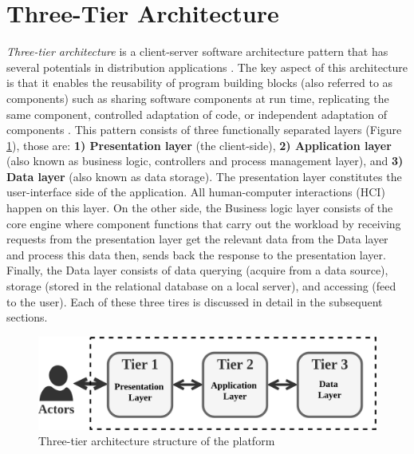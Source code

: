 \documentclass{scsSimAUDPaperFormat}
\begin{document}
\section{Three-Tier Architecture}
\label{section1}
\textit{Three-tier architecture} is a client-server software architecture pattern that has several potentials in distribution applications \cite{Booch1994OBJECT-ORIENTEDEDITION}. The key aspect of this architecture is that it enables the reusability of program building blocks (also referred to as components) such as sharing software components at run time, replicating the same component, controlled adaptation of code, or independent adaptation of components \cite{Taylor1998ThePerspective,Wijegunaratne1998DistributedEngineering}. This pattern consists of three functionally separated layers \cite{Schuldt2017Multi-tierArchitecture} (Figure \ref{fig:figure1}), those are: \textbf{1) Presentation layer} (the client-side), \textbf{2) Application layer} (also known as business logic, controllers and process management layer), and \textbf{3) Data layer} (also known as data storage). The presentation layer constitutes the user-interface side of the application. All human-computer interactions (HCI) happen on this layer. On the other side, the Business logic layer consists of the core engine where component functions that carry out the workload by receiving requests from the presentation layer get the relevant data from the Data layer and process this data then, sends back the response to the presentation layer. Finally, the Data layer consists of data querying (acquire from a data source), storage (stored in the relational database on a local server), and accessing (feed to the user). Each of these three tires is discussed in detail in the subsequent sections. 

\begin{figure}
\centering
\includegraphics[width=0.9\columnwidth]{imgs/three_tier_architecture_summary.png}
\caption{Three-tier architecture structure of the platform}
\label{fig:figure1}
\end{figure}
\end{document}
